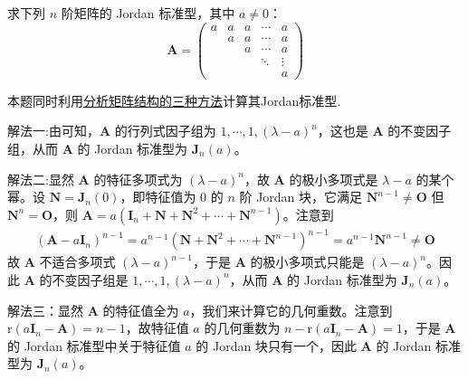 \documentclass[../../main.tex]{subfiles}%
\begin{document}
\begin{example}\label{example:元素全一样的上三角矩阵的Jordan标准型}
求下列 \(n\) 阶矩阵的 Jordan 标准型，其中 \(a \neq 0\)：
\[
\boldsymbol{A} = 
\begin{pmatrix}
a & a & a & \cdots & a \\
& a & a & \cdots & a \\
& & a & \cdots & a \\
& & & \ddots & \vdots \\
& & & & a
\end{pmatrix}
\]
\end{example}
\begin{remark}
本题同时利用\hyperlink{分析矩阵结构的方法}{分析矩阵结构的三种方法}计算其Jordan标准型.
\end{remark}
\begin{solution}

{\color{blue}解法一:}由可知，\(\boldsymbol{A}\) 的行列式因子组为 \(1, \cdots, 1, (\lambda - a)^n\)，这也是 \(\boldsymbol{A}\) 的不变因子组，从而 \(\boldsymbol{A}\) 的 Jordan 标准型为 \(\boldsymbol{J}_n(a)\)。

{\color{blue}解法二:}显然 \(\boldsymbol{A}\) 的特征多项式为 \((\lambda - a)^n\)，故 \(\boldsymbol{A}\) 的极小多项式是 \(\lambda - a\) 的某个幂。设 \(\boldsymbol{N} = \boldsymbol{J}_n(0)\)，即特征值为 \(0\) 的 \(n\) 阶 Jordan 块，它满足 \(\boldsymbol{N}^{n - 1} \neq \boldsymbol{O}\) 但 \(\boldsymbol{N}^n = \boldsymbol{O}\)，则 \(\boldsymbol{A} = a(\boldsymbol{I}_n + \boldsymbol{N} + \boldsymbol{N}^2 + \cdots + \boldsymbol{N}^{n - 1})\)。注意到
\begin{align*}
(\boldsymbol{A} - a\boldsymbol{I}_n)^{n - 1} = a^{n - 1}(\boldsymbol{N} + \boldsymbol{N}^2 + \cdots + \boldsymbol{N}^{n - 1})^{n - 1} = a^{n - 1}\boldsymbol{N}^{n - 1} \neq \boldsymbol{O}
\end{align*}
故 \(\boldsymbol{A}\) 不适合多项式 \((\lambda - a)^{n - 1}\)，于是 \(\boldsymbol{A}\) 的极小多项式只能是 \((\lambda - a)^n\)。因此 \(\boldsymbol{A}\) 的不变因子组是 \(1, \cdots, 1, (\lambda - a)^n\)，从而 \(\boldsymbol{A}\) 的 Jordan 标准型为 \(\boldsymbol{J}_n(a)\)。

{\color{blue}解法三：}显然 \(\boldsymbol{A}\) 的特征值全为 \(a\)，我们来计算它的几何重数。注意到 \(\mathrm{r}(a\boldsymbol{I}_n - \boldsymbol{A}) = n - 1\)，故特征值 \(a\) 的几何重数为 \(n - \mathrm{r}(a\boldsymbol{I}_n - \boldsymbol{A}) = 1\)，于是 \(\boldsymbol{A}\) 的 Jordan 标准型中关于特征值 \(a\) 的 Jordan 块只有一个，因此 \(\boldsymbol{A}\) 的 Jordan 标准型为 \(\boldsymbol{J}_n(a)\)。

\end{solution}
\end{document}

